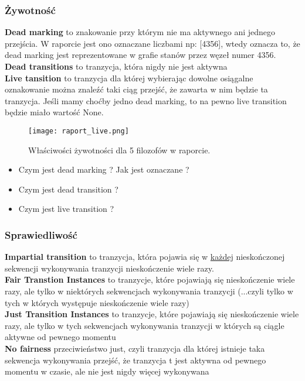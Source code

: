 \documentclass[a4paper,15pt]{article}
\begin{document}
\subsubsection{Żywotność}
\textbf{Dead marking} to znakowanie przy którym nie ma aktywnego ani jednego przejścia. W raporcie jest ono oznaczane liczbami np: [4356], wtedy oznacza to, że dead marking jest reprezentowane w grafie stanów przez węzeł numer 4356.\\
\textbf{Dead transitions} to tranzycja, która nigdy nie jest aktywna \\
\textbf{Live tansition} to tranzycja dla której wybierając dowolne osiągalne oznakowanie można znaleźć taki ciąg przejść, że zawarta w nim będzie ta tranzycja. Jeśli mamy choćby jedno dead marking, to na pewno live transition będzie miało wartość None. 

\begin{figure}[H]
\centerline{\texttt{[image: raport\_live.png]}}
\caption{Właściwości żywotności dla 5 filozofów w raporcie.}
\label{fig:raport_bound}
\end{figure}

\begin{framed}
\begin{itemize}
\item Czym jest dead marking ? Jak jest oznaczane ?
\item Czym jest dead transition ?
\item Czym jest live transition ?
\end{itemize}
\end{framed}

\subsubsection{Sprawiedliwość}
\textbf{Impartial transition} to tranzycja, która pojawia się w \underline{każdej} nieskończonej sekwencji wykonywania tranzycji nieskończenie wiele razy. \\
\textbf{Fair Transtion Instances} to tranzycje, które pojawiają się nieskończenie wiele razy, ale tylko w niektórych sekwencjach wykonywania tranzycji (...czyli tylko w tych w których występuje nieskończenie wiele razy) \\
\textbf{Just Transition Instances} to tranzycje, które pojawiają się nieskończenie wiele razy, ale tylko w tych sekwencjach wykonywania tranzycji w których są ciągle aktywne od pewnego momentu \\
\textbf{No fairness} przeciwieństwo just, czyli tranzycja dla której istnieje taka sekwencja wykonywania przejść, że tranzycja t jest aktywna od pewnego momentu w czasie, ale nie jest nigdy więcej wykonywana \\
\end{document}
